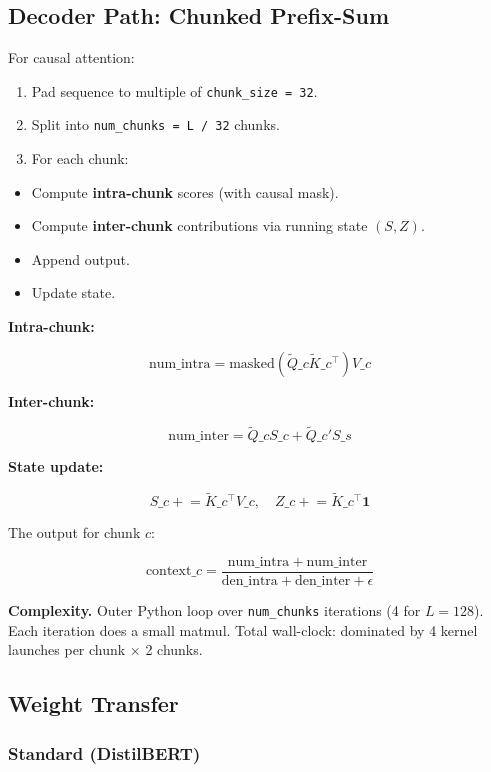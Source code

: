 \subsection{Decoder Path: Chunked Prefix-Sum}

For causal attention:

\begin{enumerate}
\item Pad sequence to multiple of \texttt{chunk\_size = 32}.
\item Split into \texttt{num\_chunks = L / 32} chunks.
\item For each chunk:
\end{enumerate}
\begin{itemize}
\item Compute \textbf{intra-chunk} scores (with causal mask).
\item Compute \textbf{inter-chunk} contributions via running state $(S, Z)$.
\item Append output.
\item Update state.

\end{itemize}
\textbf{Intra-chunk:}

\[
\text{num}\_\text{intra} = \text{masked}(\tilde{Q}\_c \tilde{K}\_c^\top) V\_c
\]

\textbf{Inter-chunk:}

\[
\text{num}\_\text{inter} = \tilde{Q}\_c S\_c + \tilde{Q}\_c' S\_s
\]

\textbf{State update:}

\[
S\_c \mathrel{+}= \tilde{K}\_c^\top V\_c, \quad
Z\_c \mathrel{+}= \tilde{K}\_c^\top \mathbf{1}
\]

The output for chunk $c$:

\[
\text{context}\_c = \frac{\text{num}\_\text{intra} + \text{num}\_\text{inter}}{\text{den}\_\text{intra} + \text{den}\_\text{inter} + \epsilon}
\]

\textbf{Complexity.} Outer Python loop over \texttt{num\_chunks} iterations (4 for $L = 128$). 
Each iteration does a small matmul. Total wall-clock: dominated by 4 kernel 
launches per chunk $\times$ 2 chunks.

\subsection{Weight Transfer}

\subsubsection{Standard (DistilBERT)}

